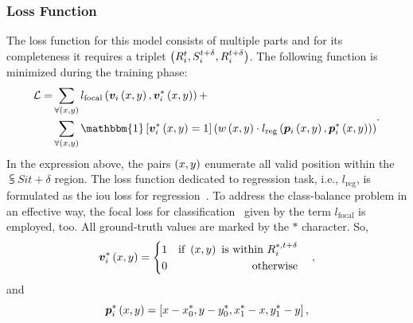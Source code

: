 \subsubsection{Loss Function}

The loss function for this model consists of multiple parts and for its completeness it requires a triplet $\left( {{R}_{i}^{t}, {S}_{i}^{t + \delta}, {R}_{i}^{t + \delta}} \right)$. The following function is minimized during the training phase:
\begin{equation}
    \begin{aligned}
    \lossf =
    &\sum_{\forall \rbrackets{x, y}}
    \func{l_{\text{focal}}}{
        \func{\mtxsub{v}{i}}{
            x, y
        },
        \func{\mtxsubsup{v}{i}{*}}{
            x, y
        }
    } +\\
    &\sum_{\forall \rbrackets{x, y}}
    \mathbbm{1}
    \sbrackets{
        \func{\mtxsubsup{v}{i}{*}}{
            x, y
        } = 1
    }
    \rbrackets{
        \func{w}{x, y}
        \cdot
        \func{l_{\text{reg}}}{
            \func{\mtxsub{p}{i}}{x, y},
            \func{\mtxsubsup{p}{i}{*}}{x, y}
        }
    }
    \end{aligned}.
\end{equation}
In the expression above, the pairs $\left( {x, y} \right)$ enumerate all valid position within the $\subsup{S}{i}{t + \delta}$ region. The loss function dedicated to regression task, i.e., $l_{\text{reg}}$, is formulated as the \gls{iou} loss for regression~\cite{danelljan2019atom, yu2016unitbox}. To address the class-balance problem in an effective way, the focal loss for classification~\cite{lin2018focal} given by the term $l_{\text{focal}}$ is employed, too. All ground-truth values are marked by the $*$ character. So,
\begin{equation}    
    {\bm{v}_{i}^{*}} \left( x, y \right) =
    \begin{cases}
        \begin{aligned}
            &1 & \text{if } \left( {x, y} \right) \text{ is within } {R}_{i}^{*, t + \delta}\\
            &0 & \text{otherwise}\\
        \end{aligned}
    \end{cases},
\end{equation}
and
\begin{equation}
    {\bm{p}_{i}^{*}} \left( x, y \right) =
    \left[ {
        x - {x}_{0}^{*},
        y - {y}_{0}^{*},
        {x}_{1}^{*} - x,
        {y}_{1}^{*} - y
    } \right],
\end{equation}
